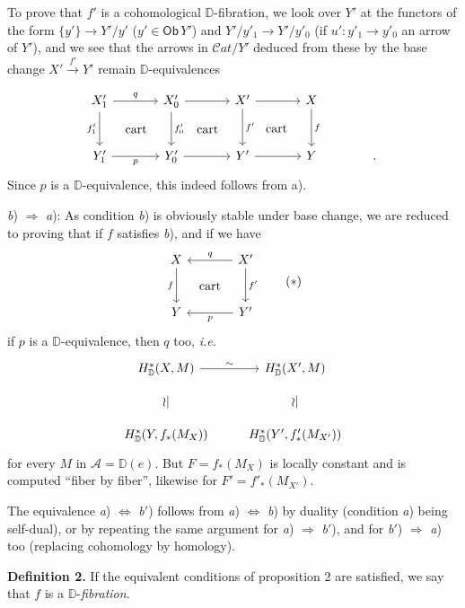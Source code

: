 \documentclass[11pt]{article}
\newcommand{\printedpage}[1]{\marginpar{\footnotesize p.~#1}}
\newcommand{\msp}[1]{\marginpar{\footnotesize [#1]}}
\newcommand{\DD}{\mathbb{D}}
\newcommand{\Ob}{\mathsf{Ob}}
\newcommand{\Cat}{\mathcal{C}at}
\begin{document}
\printedpage{49}

To prove that $f'$ is a cohomological $\DD$-fibration, we look over $Y'$ at the functors of the form $\{y'\} \to Y'/y'$ ($y' \in \Ob\, Y'$) and $Y'/y'_1 \to Y'/y'_0$ (if $u' : y'_1 \to y'_0$ an arrow of $Y'$), and we see that the arrows in $\Cat/Y'$ deduced from these by the base change $X' \xrightarrow{f'} Y'$ remain $\DD$-equivalences

\msp{page 80}

\[
\begin{tikzcd}[column sep=large, row sep=large]
X'_1 \arrow[r, "q"] \arrow[d, "f'_1"'] \arrow[dr, phantom, "\text{cart}"] & X'_0 \arrow[r] \arrow[d, "f'_0"] \arrow[dr, phantom, "\text{cart}"] & X' \arrow[r] \arrow[d, "f'"] \arrow[dr, phantom, "\text{cart}"] & X \arrow[d, "f"] \\
Y'_1 \arrow[r, "p"'] & Y'_0 \arrow[r] & Y' \arrow[r] & Y & .
\end{tikzcd}
\]
Since $p$ is a $\DD$-equivalence, this indeed follows from a).

\indent\textit{b}) $\Rightarrow$ \textit{a}): As condition \textit{b}) is obviously stable under base change, we are reduced to proving that if $f$ satisfies \textit{b}), and if we have
\[
\begin{tikzcd}[column sep=large, row sep=large]
X \arrow[d, "f"'] \arrow[dr, phantom, "\text{cart}"] & X' \arrow[l, "q"'] \arrow[d, "f'"] \\
Y & Y' \arrow[l, "p"]
\end{tikzcd}
\tag*{$(*)$}
\]
if $p$ is a $\DD$-equivalence, then $q$ too, \textit{i.e.}
\[
\begin{tikzcd}[row sep=small]
H^*_{\DD}(X,M) \arrow[r, "\sim"] & H^*_{\DD}(X',M) \\
\wr| & \wr| \\
H^*_{\DD}(Y, f_*(M_X)) & H^*_{\DD}(Y', f'_*(M_{X'}))
\end{tikzcd}
\]
for every $M$ in $\mathcal{A} = \DD(e)$. But $F = f_*(M_X)$ is locally constant and is computed ``fiber by fiber'', likewise for $F' = f'_*(M_{X'})$.

\msp{page 81}

The equivalence \textit{a}) $\Leftrightarrow$ \textit{b}$'$) follows from \textit{a}) $\Leftrightarrow$ \textit{b}) by duality (condition \textit{a}) being self-dual), or by repeating the same argument for \textit{a}) $\Rightarrow$ \textit{b}$'$), and for \textit{b}$'$) $\Rightarrow$ \textit{a}) too (replacing cohomology by homology).

\textbf{Definition 2.} If the equivalent conditions of proposition 2 are satisfied, we say that $f$ is a $\DD$-\textit{fibration}.
\end{document}
